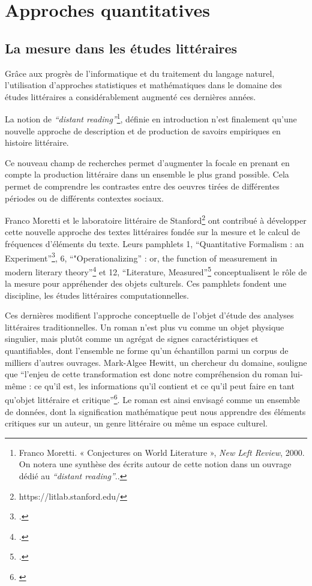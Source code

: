 \chapter{Approches quantitatives}

\section{La mesure dans les études littéraires}


Grâce aux progrès de l'informatique et du traitement du langage naturel, l'utilisation d'approches statistiques et mathématiques dans le domaine des études littéraires a considérablement augmenté ces dernières années. 

La notion de \textit{\enquote{distant reading}}\footnote{Franco Moretti. « Conjectures on World Literature », \textit{New Left Review}, 2000. On notera une synthèse des écrits autour de cette notion dans un ouvrage dédié au \textit{\enquote{distant reading}}.\cite{moretti_distant_2013}.}, définie en introduction n'est finalement qu'une nouvelle approche de description et de production de savoirs empiriques en histoire littéraire. 

Ce nouveau champ de recherches permet d'augmenter la focale en prenant en compte la production littéraire dans un ensemble le plus grand possible. Cela permet de comprendre les contrastes entre des oeuvres tirées de différentes périodes ou de différents contextes sociaux. 

Franco Moretti et le laboratoire littéraire de Stanford\footnote{https://litlab.stanford.edu/} ont contribué à développer cette nouvelle approche des textes littéraires fondée sur la mesure et le calcul de fréquences d'éléments du texte. Leurs pamphlets 1, \enquote{Quantitative Formalism : an Experiment}\footcites{allison_quantitative_2011}, 6, \enquote{"Operationalizing” : or, the function of measurement in modern literary theory}\footcites{moretti_operationalizing_2013} et 12, \enquote{Literature, Measured}\footcites{moretti_literature_2016} conceptualisent le rôle de la mesure pour appréhender des objets culturels. Ces pamphlets fondent une discipline, les études littéraires computationnelles.

Ces dernières modifient l'approche conceptuelle de l'objet d'étude des analyses littéraires traditionnelles. Un roman n'est plus vu comme un objet physique singulier, mais plutôt comme un agrégat de signes caractéristiques et quantifiables, dont l'ensemble ne forme qu'un échantillon parmi un corpus de milliers d'autres ouvrages. Mark-Algee Hewitt, un chercheur du domaine, souligne que \enquote{l'enjeu de cette transformation est donc notre compréhension du roman lui-même : ce qu'il est, les informations qu'il contient et ce qu'il peut faire en tant qu'objet littéraire et critique}\footnote{\cite{algee-hewitt_novel_2018}}. Le roman est ainsi envisagé comme un ensemble de données, dont la signification mathématique peut nous apprendre des éléments critiques sur un auteur, un genre littéraire ou même un espace culturel. 

